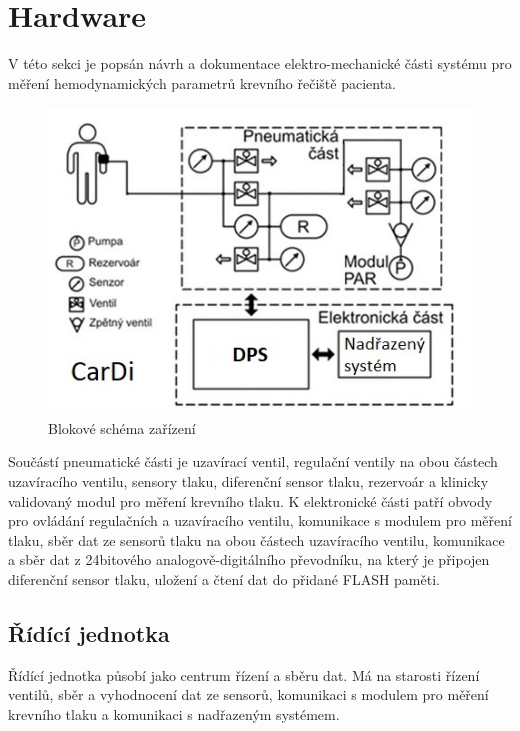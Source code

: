 \chapter{Hardware}
V této sekci je popsán návrh a dokumentace elektro-mechanické části systému pro měření hemodynamických parametrů krevního řečiště pacienta.

\begin{figure}[H]
    \label{fig:block_cardi}
    \includegraphics[width=1\textwidth]{pictures/blokove_schema_cele_zarizeni.jpg}
    \caption{Blokové schéma zařízení}
\end{figure}
Součástí pneumatické části je uzavírací ventil, regulační ventily na obou částech uzavíracího ventilu, sensory tlaku, diferenční sensor tlaku, rezervoár a klinicky validovaný modul pro měření krevního tlaku.
K elektronické části patří obvody pro ovládání regulačních a uzavíracího ventilu, komunikace s modulem pro měření tlaku, sběr dat ze sensorů tlaku na obou částech uzavíracího ventilu, komunikace a sběr dat z 24bitového analogově-digitálního převodníku, na který je připojen diferenční sensor tlaku,
uložení a čtení dat do přidané FLASH paměti.
\section{Řídící jednotka}

Řídící jednotka působí jako centrum řízení a sběru dat.
Má na starosti řízení ventilů,
sběr a vyhodnocení dat ze sensorů, komunikaci s modulem pro měření krevního tlaku a komunikaci s nadřazeným systémem. \par

